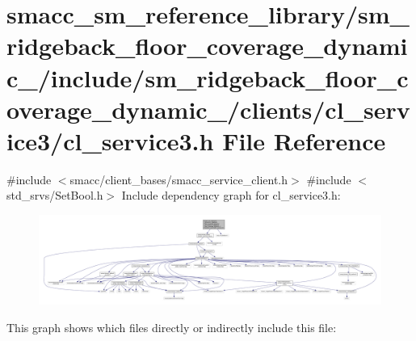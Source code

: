 \hypertarget{sm__ridgeback__floor__coverage__dynamic__1_2include_2sm__ridgeback__floor__coverage__dynamic__1_be88e234d88bf1877ca840c01df6e1c2}{}\section{smacc\+\_\+sm\+\_\+reference\+\_\+library/sm\+\_\+ridgeback\+\_\+floor\+\_\+coverage\+\_\+dynamic\+\_/include/sm\+\_\+ridgeback\+\_\+floor\+\_\+coverage\+\_\+dynamic\+\_/clients/cl\+\_\+service3/cl\+\_\+service3.h File Reference}
\label{sm__ridgeback__floor__coverage__dynamic__1_2include_2sm__ridgeback__floor__coverage__dynamic__1_be88e234d88bf1877ca840c01df6e1c2}
{\ttfamily \#include $<$smacc/client\+\_\+bases/smacc\+\_\+service\+\_\+client.\+h$>$}\newline
{\ttfamily \#include $<$std\+\_\+srvs/\+Set\+Bool.\+h$>$}\newline
Include dependency graph for cl\+\_\+service3.\+h\+:
\nopagebreak
\begin{figure}[H]
\begin{center}
\leavevmode
\includegraphics[width=350pt]{sm__ridgeback__floor__coverage__dynamic__1_2include_2sm__ridgeback__floor__coverage__dynamic__1_24515f0e6d1c5db129d512ee5928d825}
\end{center}
\end{figure}
This graph shows which files directly or indirectly include this file\+:
\nopagebreak
